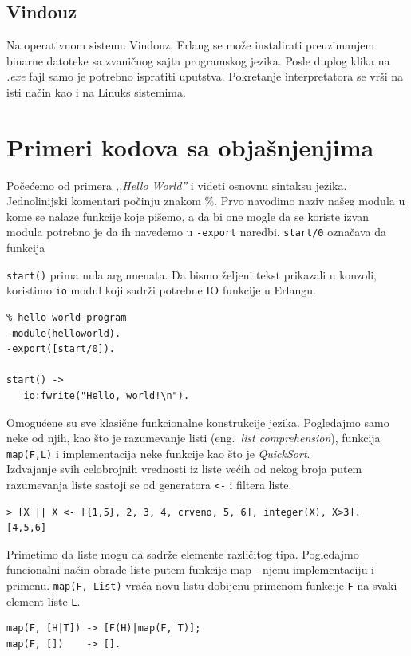\documentclass[a4paper]{article}
\begin{document}
{\subsection{Vindouz}
\label{subsec:instalacijaWindows}
Na operativnom sistemu Vindouz, Erlang se može instalirati preuzimanjem binarne datoteke sa zvaničnog sajta \cite{sajt} programskog jezika. Posle duplog klika na {\em .exe} fajl samo je potrebno ispratiti uputstva. Pokretanje interpretatora se vrši na isti način kao i na Linuks sistemima.


\section{Primeri kodova sa objašnjenjima}
\label{sec:primeri}
Počećemo od primera {\em ,,Hello World''} i videti osnovnu sintaksu jezika. 
Jednolinijski komentari počinju znakom \%. 
Prvo navodimo naziv našeg modula u kome se nalaze funkcije koje pišemo, 
a da bi one mogle da se koriste izvan modula potrebno je da ih navedemo u {\texttt{-export}} naredbi. {\texttt{start/0}} označava da funkcija {\texttt{start()} prima nula argumenata.
Da bismo željeni tekst prikazali u konzoli, koristimo {\texttt{io}} modul koji sadrži potrebne IO funkcije u Erlangu.
\begin{verbatim}
% hello world program
-module(helloworld). 
-export([start/0]). 

start() -> 
   io:fwrite("Hello, world!\n").

\end{verbatim}

Omogućene su sve klasične funkcionalne konstrukcije jezika. 
Pogledajmo samo neke od njih, kao što je razumevanje listi (eng.~{\em list comprehension}), funkcija {\texttt{map(F,L)}} i implementacija neke funkcije kao što je {\em QuickSort}.\\

Izdvajanje svih celobrojnih vrednosti iz liste većih od nekog broja putem razumevanja liste sastoji se od generatora {\texttt{<-}} i filtera liste.
\begin{verbatim}
> [X || X <- [{1,5}, 2, 3, 4, crveno, 5, 6], integer(X), X>3].
[4,5,6]
\end{verbatim}

Primetimo da liste mogu da sadrže elemente različitog tipa.
Pogledajmo funcionalni način obrade liste putem funkcije map - njenu implementaciju i primenu.
{\texttt{map(F, List)}} vraća novu listu dobijenu primenom funkcije {\texttt{F}} na svaki element liste {\texttt{L}}.
\begin{verbatim}
map(F, [H|T]) -> [F(H)|map(F, T)];
map(F, [])    -> [].


\end{verbatim}}}
\end{document}
